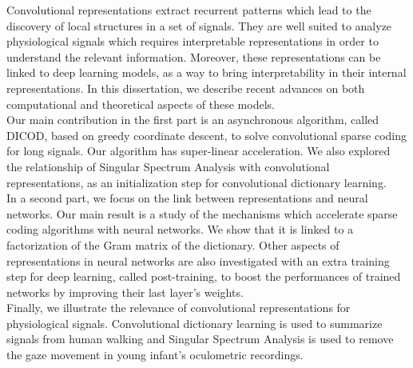 \documentclass[../thesis.tex]{subfiles}
\begin{document}
%
%
%
%
Convolutional representations extract recurrent patterns which lead to the discovery of local structures in a set of signals. They are well suited to analyze physiological signals which requires interpretable representations in order to understand the relevant information. Moreover, these representations can be linked to deep learning models, as a way to bring interpretability in their internal representations. In this dissertation, we describe recent advances on both computational and theoretical aspects of these models.\\[\parskipabstract]
%
%
Our main contribution in the first part is an asynchronous algorithm, called DICOD, based on greedy coordinate descent, to solve convolutional sparse coding for long signals. Our algorithm has super-linear acceleration. We also explored the relationship of Singular Spectrum Analysis with convolutional representations, as an initialization step for convolutional dictionary learning.\\[\parskipabstract]
%
%
In a second part, we focus on the link between representations and neural networks. Our main result is a study of the mechanisms which accelerate sparse coding algorithms with neural networks. We show that it is linked to a factorization of the Gram matrix of the dictionary. Other aspects of representations in neural networks are also investigated with an extra training step for deep learning, called post-training, to boost the performances of trained networks by improving their last layer's weights.\\[\parskipabstract]
%
%
Finally, we illustrate the relevance of convolutional representations for physiological signals. Convolutional dictionary learning is used to summarize signals from human walking and Singular Spectrum Analysis is used to remove the gaze movement in young infant's oculometric recordings.
	

\biblio{}
\end{document}
